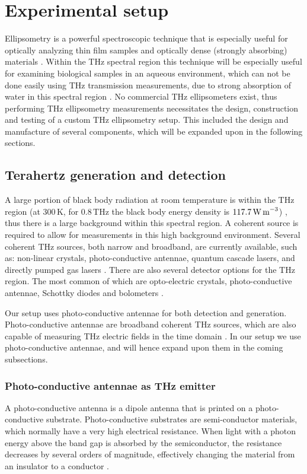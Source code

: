 \chapter{Experimental setup}
\label{chp:Setup}

Ellipsometry is a powerful spectroscopic technique that is especially useful for optically analyzing thin film samples and optically dense (strongly absorbing) materials \cite{Neshat2013}. Within the THz spectral region this technique will be especially useful for examining biological samples in an aqueous environment, which can not be done easily using THz transmission measurements, due to strong absorption of water in this spectral region \cite{Wu-2018}. No commercial THz ellipsometers exist, thus performing THz ellipsometry measurements necessitates the design, construction and testing of a custom THz ellipsometry setup. This included the design and manufacture of several components, which will be expanded upon in the following sections.

\section{Terahertz generation and detection}
\label{sec: Tera}

A large portion of black body radiation at room temperature is within the THz region (at $300\,$K, for $0.8\,$THz the black body energy density is $117.7\,\text{W\,m}^{-3}$) \cite{Swinburne-2019}, thus there is a large background within this spectral region. A coherent source is required to allow for measurements in this high background environment.
Several coherent THz sources, both narrow and broadband, are currently available, such as: non-linear crystals, photo-conductive antennae, quantum cascade lasers, and directly pumped gas lasers \cite{Hubers2008, Siegel2002, Sakai-2005, Xie2006}. There are also several detector options for the THz region. The most common of which are opto-electric crystals, photo-conductive antennae, Schottky diodes and bolometers \cite{Siegel2002, Sakai-2005, Hubers2008}. 

Our setup uses photo-conductive antennae for both detection and generation. Photo-conductive antennae are broadband coherent THz sources, which are also capable of measuring THz electric fields in the time domain \cite{Sakai-2005}. In our setup we use photo-conductive antennae, and will hence expand upon them in the coming subsections.

\subsection{Photo-conductive antennae as THz emitter}
\label{sub: ant}
A photo-conductive antenna is a dipole antenna that is printed on a photo-conductive substrate. Photo-conductive substrates are semi-conductor materials, which normally have a very high electrical resistance. When light with a photon energy above the band gap is absorbed by the semiconductor, the resistance decreases by several orders of magnitude, effectively changing the material from an insulator to a conductor \cite{Sakai-2005}.


